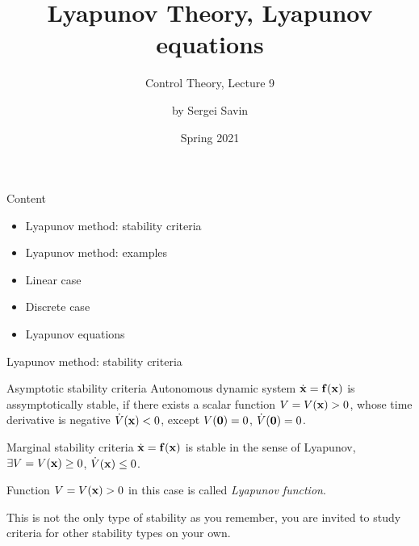 \documentclass{beamer}
\title{Lyapunov Theory, Lyapunov equations}
\subtitle{Control Theory, Lecture 9}
\author{by Sergei Savin}
\date{Spring 2021}
\begin{document}
\maketitle


\begin{frame}{Content}

\begin{itemize}
\item Lyapunov method: stability criteria
\item Lyapunov method: examples
\item Linear case
\item Discrete case
\item Lyapunov equations
\end{itemize}

\end{frame}





\begin{frame}{Lyapunov method: stability criteria}
\begin{flushleft}

\begin{block}{Asymptotic stability criteria}
Autonomous dynamic system $\dot{\mathbf{x}} = \mathbf{f}(\mathbf{x})$ is assymptotically stable, if there exists a scalar function $V = V(\mathbf{x}) > 0$, whose time derivative is negative $\dot V(\mathbf{x}) < 0$, except $V(\mathbf{0}) = 0$, $\dot V(\mathbf{0}) = 0$.
\end{block}

\begin{block}{Marginal stability criteria}
$\dot{\mathbf{x}} = \mathbf{f}(\mathbf{x})$ is stable in the sense of Lyapunov, $\exists V = V(\mathbf{x}) \geq 0$, $\dot V(\mathbf{x}) \leq 0$.
\end{block}

\begin{definition}
Function $V = V(\mathbf{x}) > 0$ in this case is called \emph{Lyapunov function}.
\end{definition}

\bigskip

This is not the only type of stability as you remember, you are invited to study criteria for other stability types on your own.

\end{flushleft}
\end{frame}
\end{document}
